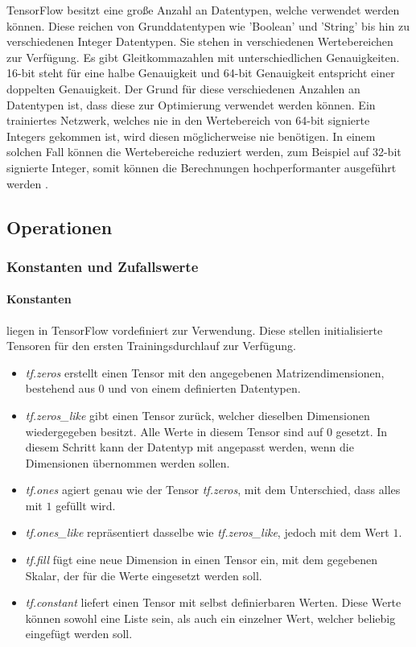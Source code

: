 TensorFlow besitzt eine große Anzahl an Datentypen, welche verwendet werden können. 
Diese reichen von Grunddatentypen wie 'Boolean' und 'String' bis hin zu verschiedenen Integer Datentypen. 
Sie stehen in verschiedenen Wertebereichen zur Verfügung. 
Es gibt Gleitkommazahlen mit unterschiedlichen Genauigkeiten. 16-bit steht für eine halbe Genauigkeit und 64-bit Genauigkeit entspricht einer doppelten Genauigkeit.
Der Grund für diese verschiedenen Anzahlen an Datentypen ist, dass diese zur Optimierung verwendet werden können. 
Ein trainiertes Netzwerk, welches nie in den Wertebereich von 64-bit signierte Integers gekommen ist, wird diesen möglicherweise nie benötigen. 
In einem solchen Fall können die Wertebereiche reduziert werden, zum Beispiel auf 32-bit signierte Integer, somit können die Berechnungen hochperformanter ausgeführt werden \cite{TensorFlow}. 

\subsection{Operationen}

\subsubsection{Konstanten und Zufallswerte}

\paragraph{Konstanten} liegen in TensorFlow vordefiniert zur Verwendung.
Diese stellen initialisierte Tensoren für den ersten Trainingsdurchlauf zur Verfügung.

\begin{itemize}
	\item \textit{tf.zeros} erstellt einen Tensor mit den angegebenen Matrizendimensionen, bestehend aus $0$ und von einem definierten Datentypen. 
	\item \textit{tf.zeros\_like} gibt einen Tensor zurück, welcher dieselben Dimensionen wiedergegeben besitzt.
	Alle Werte in diesem Tensor sind auf $0$ gesetzt.
	In diesem Schritt kann der Datentyp mit angepasst werden, wenn die Dimensionen übernommen werden sollen.
	\item \textit{tf.ones} agiert genau wie der Tensor \textit{tf.zeros}, mit dem Unterschied, dass alles mit $1$ gefüllt wird.
	\item \textit{tf.ones\_like} repräsentiert dasselbe wie \textit{tf.zeros\_like}, jedoch mit dem Wert $1$.
	\item \textit{tf.fill} fügt eine neue Dimension in einen Tensor ein, mit dem gegebenen Skalar, der für die Werte eingesetzt werden soll.
	\item \textit{tf.constant} liefert einen Tensor mit selbst definierbaren Werten. 
	Diese Werte können sowohl eine Liste sein, als auch ein einzelner Wert, welcher beliebig eingefügt werden soll. 
\end{itemize}

